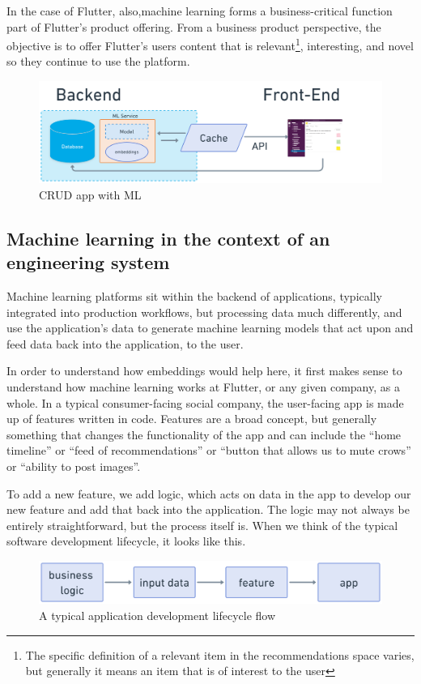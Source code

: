\documentclass[11pt]{diazessay} %
\begin{document}
In the case of Flutter, also,machine learning forms a business-critical function part of Flutter's product offering. From a business product perspective, the objective is to offer Flutter’s users content that is relevant\footnote{The specific definition of a relevant item in the recommendations space varies, but generally it means an item that is of interest to the user}, interesting, and novel so they continue to use the platform. 

\begin{figure}[!ht]
\centering
\includegraphics[width=\textwidth]{figures/web_service_ml.png}
\caption{CRUD app with ML}
\end{figure}

\subsection{Machine learning in the context of an engineering system}
Machine learning platforms sit within the backend of applications, typically integrated into production workflows, but processing data much differently, and use the application's data to generate machine learning models that act upon and feed data back into the application, to the user. 

In order to understand how embeddings would help here, it first  makes sense to understand how machine learning works at Flutter, or any given company, as a whole. In a typical consumer-facing social company, the user-facing app  is made up of features written in code. Features are a broad concept, but generally something that changes the functionality of the app and can include the “home timeline” or “feed of recommendations” or “button that allows us to mute crows” or “ability to post images”. 

To add a new feature,  we add logic, which acts on data in the app to develop our new feature and add that back into the application. The logic may not always be entirely straightforward, but the process itself is. When we think of the typical software development lifecycle, it looks like this.

\begin{figure}[!ht]
\centering
\includegraphics[width=.75\textwidth]{figures/app_flow.png}
\caption{A typical application development lifecycle flow }
\end{figure}
\end{document}

